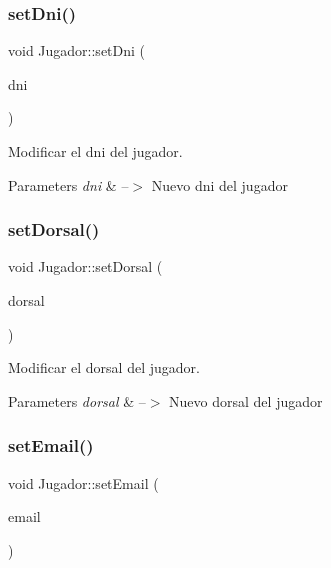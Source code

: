 \subsubsection{\texorpdfstring{set\+Dni()}{setDni()}}
{\footnotesize\ttfamily void Jugador\+::set\+Dni (\begin{DoxyParamCaption}\item[{Q\+String}]{dni }\end{DoxyParamCaption})}



Modificar el dni del jugador. 


\begin{DoxyParams}{Parameters}
{\em dni} & --$>$ Nuevo dni del jugador \\
\hline
\end{DoxyParams}
\mbox{\label{classJugador_a08e9a676f4710c0635d02e129d7cb7d0}} 
\subsubsection{\texorpdfstring{set\+Dorsal()}{setDorsal()}}
{\footnotesize\ttfamily void Jugador\+::set\+Dorsal (\begin{DoxyParamCaption}\item[{int}]{dorsal }\end{DoxyParamCaption})}



Modificar el dorsal del jugador. 


\begin{DoxyParams}{Parameters}
{\em dorsal} & --$>$ Nuevo dorsal del jugador \\
\hline
\end{DoxyParams}
\mbox{\label{classJugador_abe37872318ab13c0b6043302eb31082c}} 
\subsubsection{\texorpdfstring{set\+Email()}{setEmail()}}
{\footnotesize\ttfamily void Jugador\+::set\+Email (\begin{DoxyParamCaption}\item[{Q\+String}]{email }\end{DoxyParamCaption})}



